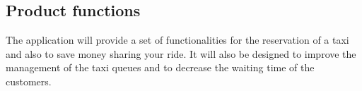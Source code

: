 \subsection{Product functions}
The application will provide a set of functionalities for the reservation of a taxi and also to save money sharing your ride. It will also be designed to improve the management of the taxi queues and to decrease the waiting time of the customers.
